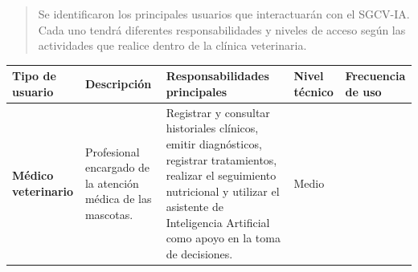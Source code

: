 \documentclass[
]{article}
\newcounter{none} %
\begin{document}
\begin{quote}
Se identificaron los principales usuarios que interactuarán con el
SGCV-IA. Cada uno tendrá diferentes responsabilidades y niveles de
acceso según las actividades que realice dentro de la clínica
veterinaria.
\end{quote}

{\def\LTcaptype{none} %
\begin{longtable}[]{@{}
  >{\raggedright\arraybackslash}p{}
  >{\raggedright\arraybackslash}p{}
  >{\raggedright\arraybackslash}p{}
  >{\raggedright\arraybackslash}p{}
  >{\raggedright\arraybackslash}p{}@{}}
\toprule\noalign{}
\begin{minipage}[b]{\linewidth}\centering
\textbf{Tipo de usuario}
\end{minipage} & \begin{minipage}[b]{\linewidth}\raggedright
\textbf{Descripción}
\end{minipage} & \begin{minipage}[b]{\linewidth}\raggedright
\textbf{Responsabilidades principales}
\end{minipage} & \begin{minipage}[b]{\linewidth}\raggedright
\textbf{Nivel técnico}
\end{minipage} & \begin{minipage}[b]{\linewidth}\raggedright
\textbf{Frecuencia de uso}
\end{minipage} \\
\midrule\noalign{}
\endhead
\bottomrule\noalign{}
\endlastfoot
\textbf{Médico veterinario} &
\begin{minipage}[t]{\linewidth}\raggedright
Profesional encargado de la atención médica de las mascotas.
\end{minipage} & \begin{minipage}[t]{\linewidth}\raggedright
Registrar y consultar historiales clínicos, emitir diagnósticos,
registrar tratamientos, realizar el seguimiento nutricional y utilizar
el asistente de Inteligencia Artificial como apoyo en la toma de decisiones.
\end{minipage} & \begin{minipage}[t]{\linewidth}\raggedright
Medio
\end{minipage} & \begin{minipage}[t]{\linewidth}\raggedright

\end{minipage}
\end{longtable}}
\end{document}
